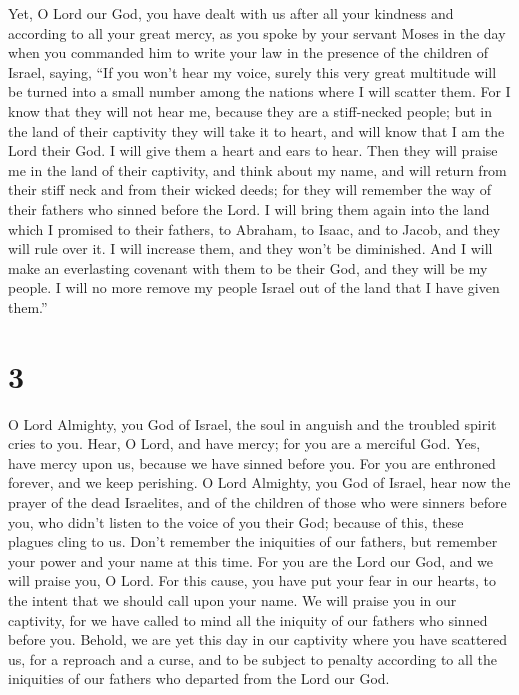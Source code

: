  Yet, O Lord our God, you have dealt with us after all your
kindness and according to all your great mercy,  as you
spoke by your servant Moses in the day when you commanded him to write
your law in the presence of the children of Israel, saying,
 ``If you won't hear my voice, surely this very great
multitude will be turned into a small number among the nations where I
will scatter them.  For I know that they will not hear me,
because they are a stiff-necked people; but in the land of their
captivity they will take it to heart,  and will know that I
am the Lord their God. I will give them a heart and ears to hear.
 Then they will praise me in the land of their captivity,
and think about my name,  and will return from their stiff
neck and from their wicked deeds; for they will remember the way of
their fathers who sinned before the Lord.  I will bring
them again into the land which I promised to their fathers, to Abraham,
to Isaac, and to Jacob, and they will rule over it. I will increase
them, and they won't be diminished.  And I will make an
everlasting covenant with them to be their God, and they will be my
people. I will no more remove my people Israel out of the land that I
have given them.''

\hypertarget{section-2}{%
\section{3}\label{section-2}}

 O Lord Almighty, you God of Israel, the soul in anguish and
the troubled spirit cries to you.  Hear, O Lord, and have
mercy; for you are a merciful God. Yes, have mercy upon us, because we
have sinned before you.  For you are enthroned forever, and
we keep perishing.  O Lord Almighty, you God of Israel, hear
now the prayer of the dead Israelites, and of the children of those who
were sinners before you, who didn't listen to the voice of you their
God; because of this, these plagues cling to us.  Don't
remember the iniquities of our fathers, but remember your power and your
name at this time.  For you are the Lord our God, and we
will praise you, O Lord.  For this cause, you have put your
fear in our hearts, to the intent that we should call upon your name. We
will praise you in our captivity, for we have called to mind all the
iniquity of our fathers who sinned before you.  Behold, we
are yet this day in our captivity where you have scattered us, for a
reproach and a curse, and to be subject to penalty according to all the
iniquities of our fathers who departed from the Lord our God.

